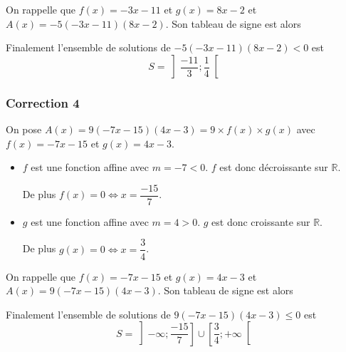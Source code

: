 \documentclass[15pt, mathserif]{beamer}
\begin{document}
\begin{frame}On rappelle que $f(x) = -3x-11$ et $g(x) = 8x-2$ et $A(x) = -5(-3x-11)(8x-2)$. Son tableau de signe est alors 

\medskip \hfil
{}

 Finalement l'ensemble de solutions de $-5(-3x-11)(8x-2)<0$ est\[S = \left]\dfrac{-11}{3};\dfrac{1}{4}\right[\]

\end{frame}


\begin{frame}
\vspace{-10mm}
	\frametitle{Correction 4}
On pose $A(x) = 9(-7x-15)(4x-3) = 9\times f(x) \times g(x)$ avec $f(x) = -7x-15$ et $g(x) = 4x-3$.

\begin{itemize}
	\item $f$ est une fonction affine avec $m =-7<0$. $f$ est donc décroissante sur $\mathbb{R}$.

	 De plus $f(x) = 0 \Leftrightarrow x = \dfrac{-15}{7}$.
	\item $g$ est une fonction affine avec $m =4>0$. $g$ est donc croissante sur $\mathbb{R}$.

	 De plus $g(x) = 0 \Leftrightarrow x = \dfrac{3}{4}$.
\end{itemize}

 \end{frame}


\begin{frame}On rappelle que $f(x) = -7x-15$ et $g(x) = 4x-3$ et $A(x) = 9(-7x-15)(4x-3)$. Son tableau de signe est alors 

\medskip \hfil
{}

 Finalement l'ensemble de solutions de $9(-7x-15)(4x-3)\leq0$ est\[S = \left]-\infty;\dfrac{-15}{7}\right]\cup\left[\dfrac{3}{4};+\infty\right[\]

\end{frame}
\end{document}
